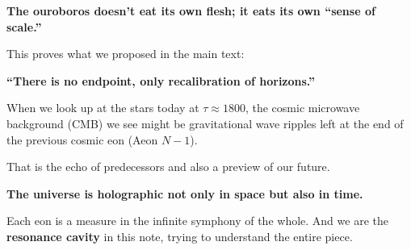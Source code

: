 \textbf{The ouroboros doesn't eat its own flesh; it eats its own ``sense of scale.''}

This proves what we proposed in the main text:

\textbf{``There is no endpoint, only recalibration of horizons.''}

When we look up at the stars today at $\tau \approx 1800$, the cosmic microwave background (CMB) we see might be gravitational wave ripples left at the end of the previous cosmic eon (Aeon $N-1$).

That is the echo of predecessors and also a preview of our future.

\textbf{The universe is holographic not only in space but also in time.}

Each eon is a measure in the infinite symphony of the whole. And we are the \textbf{resonance cavity} in this note, trying to understand the entire piece.

